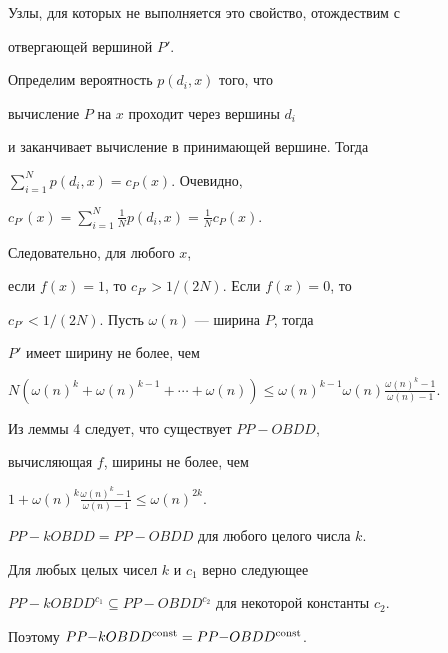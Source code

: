 \begin{pf}
Узлы, для которых не выполняется это свойство, отождествим с


отвергающей вершиной $P'$.





Определим вероятность $p(d_i,x)$ того, что


вычисление $P$ на $x$ проходит через вершины $d_i$


и заканчивает вычисление в принимающей вершине. Тогда


$\sum\limits_{i=1}^N p(d_i,x)= c_P(x)$. Очевидно,


$c_{P'}(x)=\sum\limits_{i=1}^N\frac{1}{N}p(d_i,x)= \frac{1}{N}c_P(x)$.


Следовательно, для любого $x$,


если $f(x)=1$, то $c_{P'} {>} 1/(2N)$. Если $f(x){=}0$, то


$c_{P'} < 1/(2N)$. Пусть $\omega (n)$ --- ширина $P$, тогда


$P'$ имеет ширину не более, чем


$N(\omega (n)^k+\omega (n)^{k-1}+\dotsb+\omega (n))\leq


\omega (n)^{k-1}\omega (n)


\frac{\omega (n)^k -1}{\omega (n)-1}$.


Из леммы 4 следует, что существует $PP{-}OBDD$,


вычисляющая $f$, ширины не более, чем


$1+\omega (n)^k\frac{\omega (n)^k-1}{\omega (n)-1}


\leq \omega (n)^{2k}.$


\end{pf}








\begin{cor}


$PP{-}kOBDD=PP{-}OBDD$ для любого целого числа $k$.


\end{cor}








\begin{cor}


Для любых целых чисел $k$ и $c_1$ верно следующее


$PP{-}kOBDD^{c_1} \subseteq


PP{-}OBDD^{c_2}$ для некоторой константы $c_2$.


Поэтому $PP{-}kOBDD^{\operatorname{const}}=PP{-}OBDD^{\operatorname{const}}$.


\end{cor}








